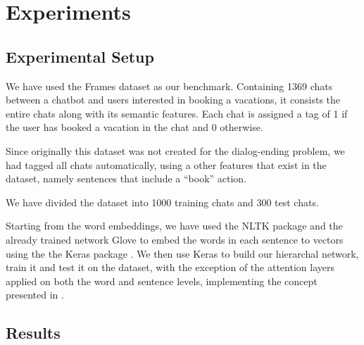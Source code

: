 \section{Experiments}\label{sec:exp}

\subsection{Experimental Setup}
We have used the Frames dataset \cite{frames} as 
our benchmark. Containing 1369 chats between 
a chatbot and users interested in booking a vacations, 
it consists the entire chats along with its semantic features. 
Each chat is assigned a tag of 1 if the user has booked a vacation 
in the chat and 0 otherwise. 

Since originally this dataset was not created for the dialog-ending problem, 
we had tagged all chats automatically, using a other features that exist 
in the dataset, namely sentences that include a ``book'' action. 

We have divided the dataset into 1000 training chats and 300 test chats.

Starting from the word embeddings, we have used the 
NLTK package \cite{DBLP:conf/acl/Bird06} and the already trained network Glove \cite{DBLP:conf/emnlp/PenningtonSM14} 
to embed the words in each sentence to vectors using the the Keras package \cite{chollet2015}. 
We then use Keras to build our hierarchal network, train it and test it on the 
dataset, with the exception of the attention layers applied on both the word and sentence 
levels, implementing the concept presented in \cite{DBLP:conf/naacl/YangYDHSH16,tc}.



\subsection{Results}
